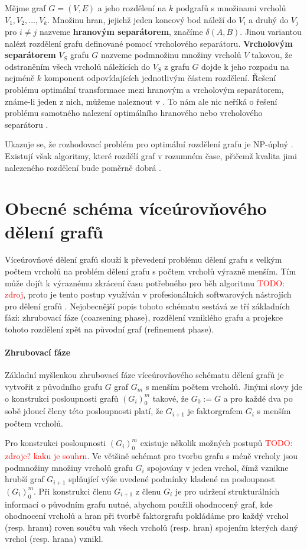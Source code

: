 \documentclass[11pt,american,czech,oneside]{book}
\theoremstyle{plain}
\theoremstyle{definition}
\newcommand{\TODO}[1]{\textcolor{red}{TODO: #1}\PackageWarning{TODO:}{TODO: #1!}}
\begin{document}
Mějme graf $G=(V,E)$ a jeho rozdělení na $k$ podgrafů s množinami vrcholů $V_1, V_2, \ldots, V_k$. Množinu hran, jejichž jeden koncový bod náleží do $V_i$ a druhý do $V_j$ pro $i \neq j$ nazveme \textbf{hranovým separátorem}, značíme $\delta(A,B)$. Jinou variantou nalézt rozdělení grafu definované pomocí vrcholového separátoru.
\textbf{Vrcholovým separátorem} $V_S$ grafu $G$ nazveme podmnožinu množiny vrcholů $V$ takovou, že odstraněním všech vrcholů náležících do $V_S$ z grafu $G$ dojde k jeho rozpadu na nejméně $k$ komponent odpovídajících jednotlivým částem rozdělení. Řešení problému optimální transformace mezi hranovým a vrcholovým separátorem, známe-li jeden z nich, můžeme naleznout v \cite{pofa:90}. To nám ale nic neříká o řešení problému samotného nalezení optimálního hranového nebo vrcholového separátoru \cite{liu:89}.

Ukazuje se, že rozhodovací problém pro optimální rozdělení grafu je NP-úplný \cite{gajo:79}. Existují však algoritmy, které rozdělí graf v rozumném čase, přičemž kvalita jimi nalezeného rozdělení bude poměrně dobrá \cite{lita:79}.

\section{Obecné schéma víceúrovňového dělení grafů}
\label{multilevel}

Víceúrovňové dělení grafů slouží k převedení problému dělení grafu s velkým počtem vrcholů na problém dělení grafu s počtem vrcholů výrazně menším. Tím může dojít k výraznému zkrácení času potřebného pro běh algoritmu \TODO{zdroj}, proto je tento postup využíván v profesionálních softwarových nástrojích pro dělení grafů \cite{lehe:95, kary:13}. Nejobecnější popis tohoto schématu sestává ze tří základních fází: zhrubovací fáze (coarsening phase), rozdělení vzniklého grafu a projekce tohoto rozdělení zpět na původní graf (refinement phase).

\paragraph{Zhrubovací fáze}
Základní myšlenkou zhrubovací fáze víceúrovňového schématu dělení grafů je vytvořit z původního grafu $G$ graf $G_m$ s menším počtem vrcholů. Jinými slovy jde o konstrukci posloupnosti grafů $(G_i)_0^m$ takové, že $G_0 := G$ a pro každé dva po sobě jdoucí členy této posloupnosti platí, že $G_{i+1}$ je faktorgrafem $G_i$ s menším počtem vrcholů. 

Pro konstrukci posloupnosti $(G_i)_0^m$ existuje několik možných postupů \cite{kaku:98} \TODO{zdroje? kaku je souhrn}. Ve většině schémat pro tvorbu grafu s méně vrcholy jsou podmnožiny množiny vrcholů grafu $G_i$ spojovány v jeden vrchol, čímž vznikne hrubší graf $G_{i+1}$ splňující výše uvedené podmínky kladené na posloupnost $(G_i)_0^m$. Při konstrukci členu $G_{i+1}$ z členu $G_i$ je pro udržení strukturálních informací o původním grafu nutné, abychom použili ohodnocený graf, kde ohodnocení vrcholů a hran při tvorbě faktorgrafu pokládáme pro každý vrchol (resp. hranu) roven součtu vah všech vrcholů (resp. hran) spojením kterých daný vrchol (resp. hrana) vznikl. 
\end{document}
